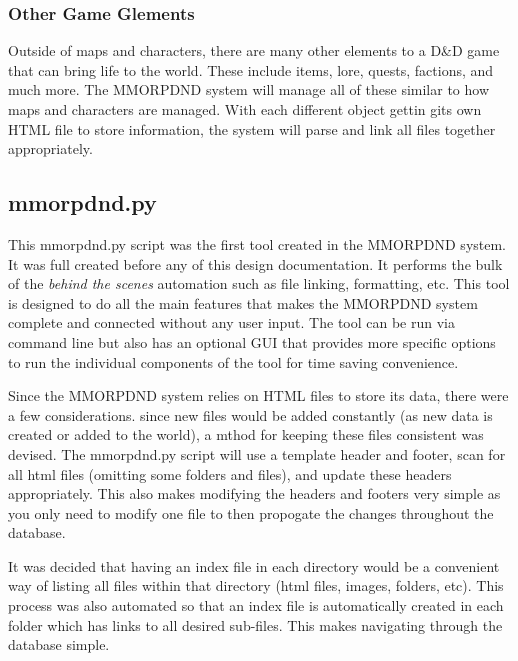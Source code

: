 \subsubsection{Other Game Glements}

Outside of maps and characters, there are many other elements to a D\&D game that can bring life to the world. These include items, lore, quests, factions, and much more. The MMORPDND system will manage all of these similar to how maps and characters are managed. With each different object gettin gits own HTML file to store information, the system will parse and link all files together appropriately.





\subsection{mmorpdnd.py}

This mmorpdnd.py script was the first tool created in the MMORPDND system. It was full created before any of this design documentation. It performs the bulk of the \textit{behind the scenes} automation such as file linking, formatting, etc. This tool is designed to do all the main features that makes the MMORPDND system complete and connected without any user input. The tool can be run via command line but also has an optional GUI that provides more specific options to run the individual components of the tool for time saving convenience.

Since the MMORPDND system relies on HTML files to store its data, there were a few considerations. since new files would be added constantly (as new data is created or added to the world), a mthod for keeping these files consistent was devised. The mmorpdnd.py script will use a template header and footer, scan for all html files (omitting some folders and files), and update these headers appropriately. This also makes modifying the headers and footers very simple as you only need to modify one file to then propogate the changes throughout the database.

It was decided that having an index file in each directory would be a convenient way of listing all files within that directory (html files, images, folders, etc). This process was also automated so that an index file is automatically created in each folder which has links to all desired sub-files. This makes navigating through the database simple.

